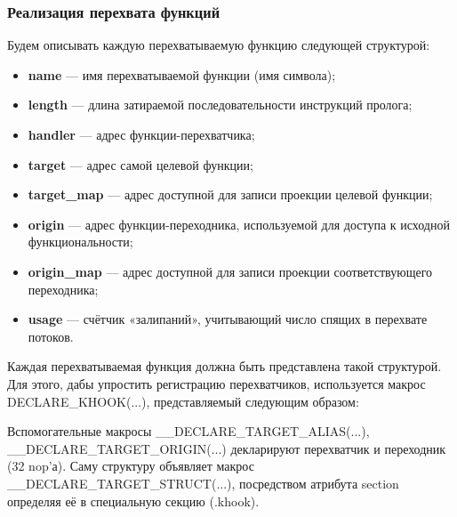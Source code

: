 \subsubsection{Реализация перехвата функций}
Будем описывать каждую перехватываемую функцию следующей структурой:

\begin{itemize}
\item \textbf{name} — имя перехватываемой функции (имя символа);
\item \textbf{length} — длина затираемой последовательности инструкций пролога;
\item \textbf{handler} — адрес функции-перехватчика;
\item \textbf{target} — адрес самой целевой функции;
\item \textbf{target\_map} — адрес доступной для записи проекции целевой функции;
\item \textbf{origin} — адрес функции-переходника, используемой для доступа к исходной функциональности;
\item \textbf{origin\_map} — адрес доступной для записи проекции соответствующего переходника;
\item \textbf{usage} — счётчик «залипаний», учитывающий число спящих в перехвате потоков.
\end{itemize}
Каждая перехватываемая функция должна быть представлена такой структурой. Для этого, дабы упростить регистрацию перехватчиков, используется макрос DECLARE\_KHOOK(...), представляемый следующим образом:


Вспомогательные макросы \_\_DECLARE\_TARGET\_ALIAS(...), \_\_DECLARE\_TARGET\_ORIGIN(...) декларируют перехватчик и переходник (32 nop'а). Саму структуру объявляет макрос \_\_DECLARE\_TARGET\_STRUCT(...), посредством атрибута section определяя её в специальную секцию (.khook).

